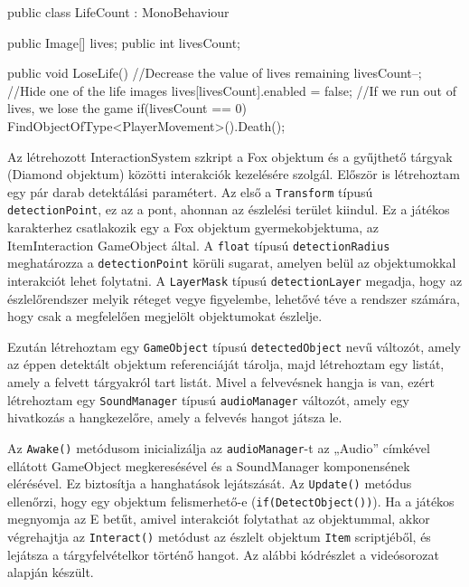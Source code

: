 \begin{java}
public class LifeCount : MonoBehaviour
{
    public Image[] lives;
    public int livesCount;

    public void LoseLife()
    {
        //Decrease the value of lives remaining
        livesCount--;
        //Hide one of the life images
        lives[livesCount].enabled = false;  
        //If we run out of lives, we lose the game
        if(livesCount == 0)
        {
            FindObjectOfType<PlayerMovement>().Death();
        }
    }
}
\end{java}


Az létrehozott InteractionSystem szkript a Fox objektum és a gyűjthető tárgyak (Diamond objektum) közötti interakciók kezelésére szolgál. Először is létrehoztam egy pár darab detektálási paramétert. Az első a \texttt{Transform} típusú \texttt{detectionPoint}, ez az a pont, ahonnan az észlelési terület kiindul. Ez a játékos karakterhez csatlakozik egy a Fox objektum gyermekobjektuma, az ItemInteraction GameObject által. A \texttt{float} típusú \texttt{detectionRadius} meghatározza a \texttt{detectionPoint} körüli sugarat, amelyen belül az objektumokkal interakciót lehet folytatni. A \texttt{LayerMask} típusú \texttt{detectionLayer} megadja, hogy az észlelőrendszer melyik réteget vegye figyelembe, lehetővé téve a rendszer számára, hogy csak a megfelelően megjelölt objektumokat észlelje.

Ezután létrehoztam egy \texttt{GameObject} típusú \texttt{detectedObject} nevű változót, amely az éppen detektált objektum referenciáját tárolja, majd létrehoztam egy listát, amely a felvett tárgyakról tart listát. Mivel a felvevésnek hangja is van, ezért létrehoztam egy \texttt{SoundManager} típusú \texttt{audioManager} változót, amely egy hivatkozás a hangkezelőre, amely a felvevés hangot játsza le.

Az \texttt{Awake()} metódusom inicializálja az \texttt{audioManager}-t az „Audio” címkével ellátott GameObject megkeresésével és a SoundManager komponensének elérésével. Ez biztosítja a hanghatások lejátszását. Az \texttt{Update()} metódus ellenőrzi, hogy egy objektum felismerhető-e (\texttt{if(DetectObject())}). Ha a játékos megnyomja az E betűt, amivel interakciót folytathat az objektummal, akkor végrehajtja az \texttt{Interact()} metódust az észlelt objektum \texttt{Item} scriptjéből, és lejátsza a tárgyfelvételkor történő hangot. Az alábbi kódrészlet a \cite{youtubeplaylist} videósorozat alapján készült.

